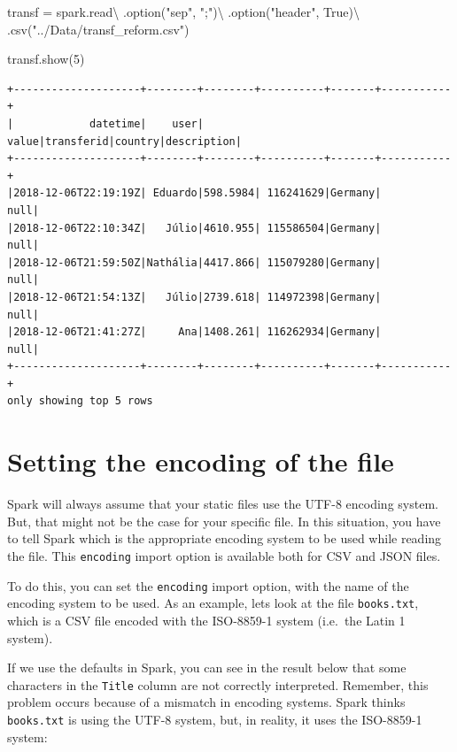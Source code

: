 \documentclass[
  11pt,
  letterpaper,
  DIV=11,
  numbers=noendperiod]{scrreprt}
\newenvironment{Shaded}{\begin{snugshade}}{\end{snugshade}}
\newcommand{\DecValTok}[1]{\textcolor[rgb]{0.68,0.00,0.00}{#1}}
\newcommand{\NormalTok}[1]{\textcolor[rgb]{0.00,0.23,0.31}{#1}}
\newcommand{\OperatorTok}[1]{\textcolor[rgb]{0.37,0.37,0.37}{#1}}
\newcommand{\StringTok}[1]{\textcolor[rgb]{0.13,0.47,0.30}{#1}}
\newcommand{\VariableTok}[1]{\textcolor[rgb]{0.07,0.07,0.07}{#1}}
\begin{document}
\begin{Shaded}
\begin{Highlighting}[]
\NormalTok{transf }\OperatorTok{=}\NormalTok{ spark.read}\OperatorTok{\textbackslash{}}
\NormalTok{  .option(}\StringTok{"sep"}\NormalTok{, }\StringTok{";"}\NormalTok{)}\OperatorTok{\textbackslash{}}
\NormalTok{  .option(}\StringTok{"header"}\NormalTok{, }\VariableTok{True}\NormalTok{)}\OperatorTok{\textbackslash{}}
\NormalTok{  .csv(}\StringTok{"../Data/transf\_reform.csv"}\NormalTok{)}
  
\NormalTok{transf.show(}\DecValTok{5}\NormalTok{)}
\end{Highlighting}
\end{Shaded}

\begin{verbatim}
+--------------------+--------+--------+----------+-------+-----------+
|            datetime|    user|   value|transferid|country|description|
+--------------------+--------+--------+----------+-------+-----------+
|2018-12-06T22:19:19Z| Eduardo|598.5984| 116241629|Germany|       null|
|2018-12-06T22:10:34Z|   Júlio|4610.955| 115586504|Germany|       null|
|2018-12-06T21:59:50Z|Nathália|4417.866| 115079280|Germany|       null|
|2018-12-06T21:54:13Z|   Júlio|2739.618| 114972398|Germany|       null|
|2018-12-06T21:41:27Z|     Ana|1408.261| 116262934|Germany|       null|
+--------------------+--------+--------+----------+-------+-----------+
only showing top 5 rows
\end{verbatim}

\hypertarget{setting-the-encoding-of-the-file}{%
\section{Setting the encoding of the
file}\label{setting-the-encoding-of-the-file}}

Spark will always assume that your static files use the UTF-8 encoding
system. But, that might not be the case for your specific file. In this
situation, you have to tell Spark which is the appropriate encoding
system to be used while reading the file. This \texttt{encoding} import
option is available both for CSV and JSON files.

To do this, you can set the \texttt{encoding} import option, with the
name of the encoding system to be used. As an example, lets look at the
file \texttt{books.txt}, which is a CSV file encoded with the ISO-8859-1
system (i.e.~the Latin 1 system).

If we use the defaults in Spark, you can see in the result below that
some characters in the \texttt{Title} column are not correctly
interpreted. Remember, this problem occurs because of a mismatch in
encoding systems. Spark thinks \texttt{books.txt} is using the UTF-8
system, but, in reality, it uses the ISO-8859-1 system:
\end{document}
